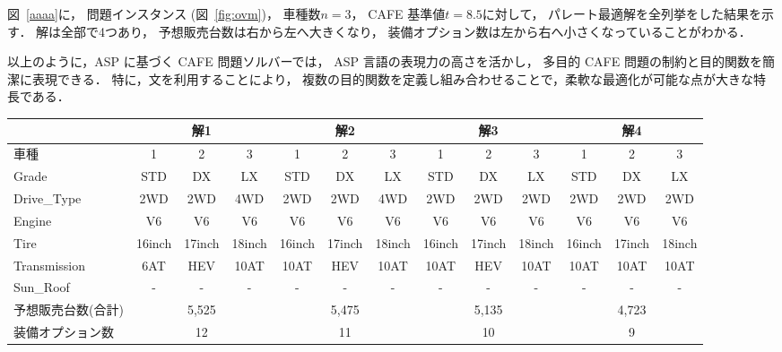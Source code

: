 図~\ref{aaaa}に，
問題インスタンス (図~\ref{fig:ovm})，
車種数$n=3$，
CAFE 基準値$t=8.5$に対して，
パレート最適解を全列挙をした結果を示す．
解は全部で4つあり，
予想販売台数は右から左へ大きくなり，
装備オプション数は左から右へ小さくなっていることがわかる．

以上のように，ASP に基づく CAFE 問題ソルバーでは，
ASP 言語の表現力の高さを活かし，
多目的 CAFE 問題の制約と目的関数を簡潔に表現できる．
特に，文を利用することにより，
複数の目的関数を定義し組み合わせることで，柔軟な最適化が可能な点が大きな特長である．


  

\begin{figure*}[t]\centering
  \tabcolsep=1mm
  \begin{tabular}{l|c|c|c||c|c|c||c|c|c||c|c|c}\bhline
    & \multicolumn{3}{c||}{解1} & \multicolumn{3}{c||}{解2} & \multicolumn{3}{c||}{解3} & \multicolumn{3}{c}{解4}\\ \hline
    車種 & 1 & 2 & 3 & 1 & 2 & 3 & 1 & 2 & 3 & 1 & 2 & 3 \\ \hline
    \textsf{Grade} & \textsf{STD} & \textsf{DX} & \textsf{LX} & \textsf{STD} & \textsf{DX} & \textsf{LX} & \textsf{STD} & \textsf{DX} & \textsf{LX} & \textsf{STD} & \textsf{DX} & \textsf{LX} \\
    \textsf{Drive\_Type} & \textsf{2WD} & \textsf{2WD} & \textsf{4WD} & \textsf{2WD} & \textsf{2WD} & \textsf{4WD} & \textsf{2WD} & \textsf{2WD} & \textsf{2WD} & \textsf{2WD} & \textsf{2WD} & \textsf{2WD} \\
    \textsf{Engine} & \textsf{V6} & \textsf{V6} & \textsf{V6} & \textsf{V6} & \textsf{V6} & \textsf{V6} & \textsf{V6} & \textsf{V6} & \textsf{V6} & \textsf{V6} & \textsf{V6} & \textsf{V6} \\
    \textsf{Tire} & \textsf{16inch} & \textsf{17inch} & \textsf{18inch} & \textsf{16inch} & \textsf{17inch} & \textsf{18inch} & \textsf{16inch} & \textsf{17inch} & \textsf{18inch} & \textsf{16inch} & \textsf{17inch} & \textsf{18inch} \\
    \textsf{Transmission} & \textsf{6AT} & \textsf{HEV} & \textsf{10AT} & \textsf{10AT} & \textsf{HEV} & \textsf{10AT} & \textsf{10AT} & \textsf{HEV} & \textsf{10AT} & \textsf{10AT} & \textsf{10AT} & \textsf{10AT} \\
    \textsf{Sun\_Roof} & \textsf{-} & \textsf{-} & \textsf{-} & \textsf{-} & \textsf{-} & \textsf{-} & \textsf{-} & \textsf{-} & \textsf{-} & \textsf{-} & \textsf{-} & \textsf{-} \\\bhline
    予想販売台数(合計)  & \multicolumn{3}{c||}{5,525} & \multicolumn{3}{c||}{5,475} & \multicolumn{3}{c||}{5,135} & \multicolumn{3}{c}{4,723} \\ 
   装備オプション数 & \multicolumn{3}{c||}{12} & \multicolumn{3}{c||}{11} & \multicolumn{3}{c||}{10} & \multicolumn{3}{c}{9} \\ \hline
  \end{tabular}
  \caption{多目的 CAFE 問題(図~\ref{fig:ovm})のパレート最適解全列挙}
  \label{aaaa}
\end{figure*}


